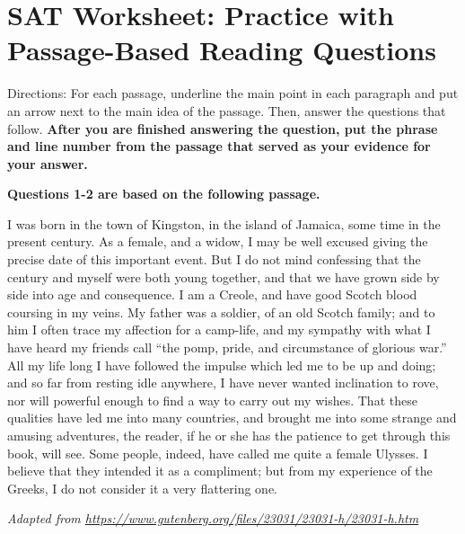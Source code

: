 \section{\sloppy SAT Worksheet: Practice with Passage-Based Reading Questions}

Directions: For each passage, underline the main point in each paragraph and put an arrow next
to the main idea of the passage. Then, answer the questions that follow. \textbf{After you are finished
answering the question, put the phrase and line number from the passage that served
as your evidence for your answer.}

\textbf{Questions 1-2 are based on the following passage.}

\begin{linenumbers*}
\modulolinenumbers[5] 
\indent I was born in the town of Kingston, in the island of Jamaica, some time in the present century. As a female, and a widow, I may be well excused giving the precise date of this important event. But I do not mind confessing that the century and myself were both young together, and that we have grown side by side into age and consequence. I am a Creole, and have good Scotch blood coursing in my veins. My father was a soldier, of an old Scotch family; and to him I often trace my affection for a camp-life, and my sympathy with what I have heard my friends call ``the pomp, pride, and circumstance of glorious war.'' All my life long I have followed the impulse which led me to be up and doing; and so far from resting idle anywhere, I have never wanted inclination to rove, nor will powerful enough to find a way to carry out my wishes. That these qualities have led me into many countries, and brought me into some strange and amusing adventures, the reader, if he or she has the patience to get through this book, will see. Some people, indeed, have called me quite a female Ulysses. I believe that they intended it as a compliment; but from my experience of the Greeks, I do not consider it a very flattering one.
\end{linenumbers*}

\textit{Adapted from \url{https://www.gutenberg.org/files/23031/23031-h/23031-h.htm}}


